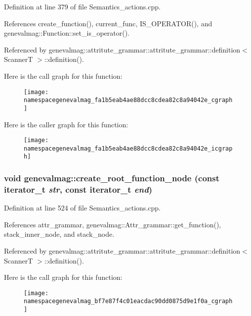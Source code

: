 Definition at line 379 of file Semantics\_\-actions.cpp.

References create\_\-function(), current\_\-func, IS\_\-OPERATOR(), and genevalmag::Function::set\_\-is\_\-operator().

Referenced by genevalmag::attritute\_\-grammar::attritute\_\-grammar::definition$<$ ScannerT $>$::definition().

Here is the call graph for this function:\nopagebreak
\begin{figure}[H]
\begin{center}
\leavevmode
\texttt{[image: namespacegenevalmag\_fa1b5eab4ae88dcc8cdea82c8a94042e\_cgraph]}
\end{center}
\end{figure}


Here is the caller graph for this function:\nopagebreak
\begin{figure}[H]
\begin{center}
\leavevmode
\texttt{[image: namespacegenevalmag\_fa1b5eab4ae88dcc8cdea82c8a94042e\_icgraph]}
\end{center}
\end{figure}
\hypertarget{namespacegenevalmag_bf7e87f4c01eacdac90dd0875d9e1f0a}{
\subsubsection[{create\_\-root\_\-function\_\-node}]{\setlength{\rightskip}{0pt plus 5cm}void genevalmag::create\_\-root\_\-function\_\-node (const iterator\_\-t {\em str}, \/  const iterator\_\-t {\em end})}}
\label{namespacegenevalmag_bf7e87f4c01eacdac90dd0875d9e1f0a}




Definition at line 524 of file Semantics\_\-actions.cpp.

References attr\_\-grammar, genevalmag::Attr\_\-grammar::get\_\-function(), stack\_\-inner\_\-node, and stack\_\-node.

Referenced by genevalmag::attritute\_\-grammar::attritute\_\-grammar::definition$<$ ScannerT $>$::definition().

Here is the call graph for this function:\nopagebreak
\begin{figure}[H]
\begin{center}
\leavevmode
\texttt{[image: namespacegenevalmag\_bf7e87f4c01eacdac90dd0875d9e1f0a\_cgraph]}
\end{center}
\end{figure}


